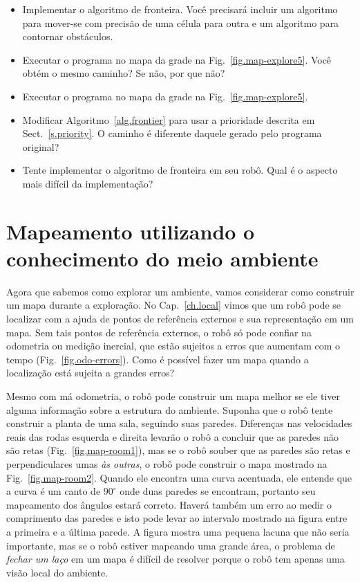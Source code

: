 \begin{framed}
\begin{itemize}
\item Implementar o algoritmo de fronteira. Você precisará incluir um algoritmo para mover-se com precisão de uma célula para outra e um algoritmo para contornar obstáculos.
\item Executar o programa no mapa da grade na Fig.~\ref{fig.map-explore5}. Você obtém o mesmo caminho? Se não, por que não?
\item Executar o programa no mapa da grade na Fig.~\ref{fig.map-explore5}.
\item Modificar Algoritmo~\ref{alg.frontier} para usar a prioridade descrita em Sect.~\ref{s.priority}. O caminho é diferente daquele gerado pelo programa original?
\item Tente implementar o algoritmo de fronteira em seu robô. Qual é o aspecto mais difícil da implementação?
\end{itemize}
\end{framed}

\section{Mapeamento utilizando o conhecimento do meio ambiente}\label{s.map-update}

Agora que sabemos como explorar um ambiente, vamos considerar como construir um mapa durante a exploração. No Cap.~\ref{ch.local} vimos que um robô pode se localizar com a ajuda de pontos de referência externos e sua representação em um mapa. Sem tais pontos de referência externos, o robô só pode confiar na odometria ou medição inercial, que estão sujeitos a erros que aumentam com o tempo (Fig.~\ref{fig.odo-errors}). Como é possível fazer um mapa quando a localização está sujeita a grandes erros?

Mesmo com má odometria, o robô pode construir um mapa melhor se ele tiver alguma informação sobre a estrutura do ambiente. Suponha que o robô tente construir a planta de uma sala, seguindo suas paredes. Diferenças nas velocidades reais das rodas esquerda e direita levarão o robô a concluir que as paredes não são retas (Fig.~\ref{fig.map-room1}), mas se o robô souber que as paredes são retas e perpendiculares umas \emph{às outras}, o robô pode construir o mapa mostrado na Fig.~\ref{fig.map-room2}. Quando ele encontra uma curva acentuada, ele entende que a curva é um canto de $90^\circ$ onde duas paredes se encontram, portanto seu mapeamento dos ângulos estará correto. Haverá também um erro ao medir o comprimento das paredes e isto pode levar ao intervalo mostrado na figura entre a primeira e a última parede. A figura mostra uma pequena lacuna que não seria importante, mas se o robô estiver mapeando uma grande área, o problema de \emph{fechar um laço} em um mapa é difícil de resolver porque o robô tem apenas uma visão local do ambiente.

